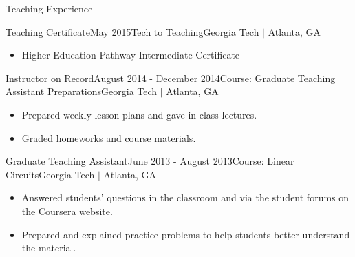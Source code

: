 \documentclass{resume} %
\newcommand{\sectionspace}{\vspace{3mm}}
\begin{document}


\sectionspace

\begin{rSection}{Teaching Experience}

\begin{rSubsection}{Teaching Certificate}{May 2015}{Tech to Teaching}{Georgia
    Tech $\vert$ Atlanta, GA}
\item
\begin{itemize}
\item Higher Education Pathway Intermediate Certificate
\end{itemize}
\end{rSubsection}


\begin{rSubsection}{Instructor on Record}{August 2014 - December 2014}{Course:
    Graduate Teaching Assistant Preparations}{Georgia Tech $\vert$ Atlanta, GA}
\item
\begin{itemize}
\item Prepared weekly lesson plans and gave in-class lectures.
\item Graded homeworks and course materials.
\end{itemize}
\end{rSubsection}


\begin{rSubsection}{Graduate Teaching Assistant}{June 2013 - August
    2013}{Course: Linear Circuits}{Georgia Tech $\vert$ Atlanta, GA}
\item
\begin{itemize}
\item Answered students' questions in the classroom and via the student forums
  on the Coursera website.
\item Prepared and explained practice problems to help students better
  understand the material.
\end{itemize}
\end{rSubsection}

\end{rSection}




\end{document}
